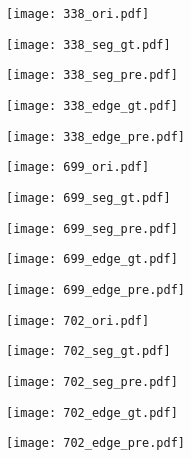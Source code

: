 \documentclass[runningheads]{llncs}
\begin{document}
\begin{figure}
\begin{subfigure}{.193\textwidth}
  \centering
  \texttt{[image: 338\_ori.pdf]}
\end{subfigure} \hfil
\begin{subfigure}{.193\textwidth}
  \centering
  \texttt{[image: 338\_seg\_gt.pdf]}
\end{subfigure} \hfil
\begin{subfigure}{.193\textwidth}
  \centering
  \texttt{[image: 338\_seg\_pre.pdf]}
\end{subfigure} \hfil
\begin{subfigure}{.193\textwidth}
  \centering
  \texttt{[image: 338\_edge\_gt.pdf]}
\end{subfigure} \hfil
\begin{subfigure}{.193\textwidth}
  \centering
  \texttt{[image: 338\_edge\_pre.pdf]}
\end{subfigure}

\begin{subfigure}{.193\textwidth}
  \centering
  \texttt{[image: 699\_ori.pdf]}
\end{subfigure} \hfil
\begin{subfigure}{.193\textwidth}
  \centering
  \texttt{[image: 699\_seg\_gt.pdf]}
\end{subfigure} \hfil
\begin{subfigure}{.193\textwidth}
  \centering
  \texttt{[image: 699\_seg\_pre.pdf]}
\end{subfigure} \hfil
\begin{subfigure}{.193\textwidth}
  \centering
  \texttt{[image: 699\_edge\_gt.pdf]}
\end{subfigure} \hfil
\begin{subfigure}{.193\textwidth}
  \centering
  \texttt{[image: 699\_edge\_pre.pdf]}
\end{subfigure}

\begin{subfigure}{.193\textwidth}
  \centering
  \texttt{[image: 702\_ori.pdf]}
\end{subfigure} \hfil
\begin{subfigure}{.193\textwidth}
  \centering
  \texttt{[image: 702\_seg\_gt.pdf]}
\end{subfigure} \hfil
\begin{subfigure}{.193\textwidth}
  \centering
  \texttt{[image: 702\_seg\_pre.pdf]}
\end{subfigure} \hfil
\begin{subfigure}{.193\textwidth}
  \centering
  \texttt{[image: 702\_edge\_gt.pdf]}
\end{subfigure} \hfil
\begin{subfigure}{.193\textwidth}
  \centering
  \texttt{[image: 702\_edge\_pre.pdf]}
\end{subfigure}


\end{figure}
\end{document}
